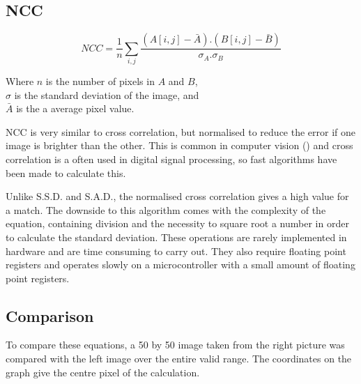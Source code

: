 \subsection{NCC}
\begin{equation}\label{eq:NCC}
NCC =  \frac{1}{n}\sum\limits_{i,j} \frac{(A[i,j] - \bar{A}).(B[i,j] - \bar{B})}{\sigma _A . \sigma _B}
\end{equation}
\begin{center}
Where $n$ is the number of pixels in $A$ and $B$, \\$\sigma$ is the standard deviation of the image, and \\$\bar{A}$ is the a average pixel value. 
\end{center}
NCC is very similar to cross correlation, but normalised to reduce the error if one image is brighter than the other. This is common in computer vision (\cite{Tsai:NCC}) and cross correlation is a often used in digital signal processing, so fast algorithms have been made to calculate this. 

Unlike S.S.D. and S.A.D., the normalised cross correlation gives a high value for a match. The downside to this algorithm comes with the complexity of the equation, containing division and the necessity to square root a number in order to calculate the standard deviation. These operations are rarely implemented in hardware and are time consuming to carry out. They also require floating point registers and operates slowly on a microcontroller with a small amount of floating point registers. 



\subsection{Comparison}

To compare these equations, a 50 by 50 image taken from the right picture was compared with the left image over the entire valid range. The coordinates on the graph give the centre pixel of the calculation. 

